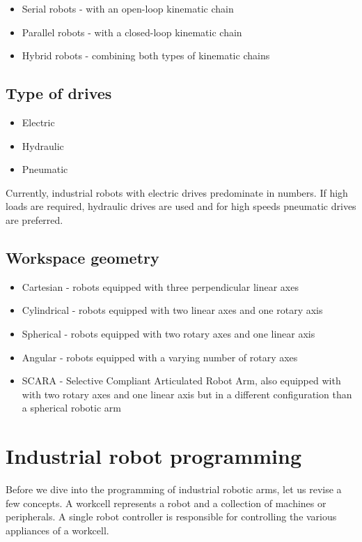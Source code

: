 \begin{itemize}
    \item Serial robots - with an open-loop kinematic chain
    \item Parallel robots - with a closed-loop kinematic chain
    \item Hybrid robots - combining both types of kinematic chains
\end{itemize}


\subsection*{Type of drives}

\begin{itemize}
    \item Electric
    \item Hydraulic
    \item Pneumatic
\end{itemize}

Currently, industrial robots with electric drives predominate in numbers. If high loads are required, hydraulic drives are used and for high speeds pneumatic drives are preferred.

\subsection*{Workspace geometry}

\begin{itemize}
    \item Cartesian - robots equipped with three perpendicular linear axes
    \item Cylindrical - robots equipped with two linear axes and one rotary axis
    \item Spherical -  robots equipped with two rotary axes and one linear axis
    \item Angular - robots equipped with a varying number of rotary axes
    \item SCARA - Selective Compliant Articulated Robot Arm, also equipped with with two rotary axes and one linear axis but in a different configuration than a spherical robotic arm
\end{itemize}

\section{Industrial robot programming}

Before we dive into the programming of industrial robotic arms, let us revise a few concepts.
A workcell represents a robot and a collection of machines or peripherals. A single robot controller is responsible for controlling the various appliances of a workcell.

